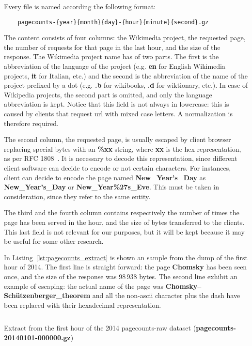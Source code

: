 Every file is named according the following format:
\begin{verbatim}
    pagecounts-{year}{month}{day}-{hour}{minute}{second}.gz
\end{verbatim}
The content consists of four columns: the Wikimedia project, the requested page, the number of requests for that page in the last hour, and the size of the response.
The Wikimedia project name has of two parts.
The first is the abbreviation of the language of the project (e.g. \textbf{en} for English Wikimedia projects, \textbf{it} for Italian, etc.) and the second is the abbreviation of the name of the project prefixed by a dot (e.g. \textbf{.b} for wikibooks, \textbf{.d} for wiktionary, etc.).
In case of Wikipedia projects, the second part is omitted, and only the language abbreviation is kept.
Notice that this field is not always in lowercase: this is caused by clients that request url with mixed case letters.
A normalization is therefore required.

The second column, the requested page, is usually escaped by client browser replacing special bytes with an \textbf{\%xx} string, where \textbf{xx} is the hex representation, as per RFC 1808~\cite{rfc1808}.
It is necessary to decode this representation, since different client software can decide to encode or not certain characters.
For instances, client can decide to encode the page named \textbf{New\_Year's\_Day} as \textbf{New\_Year's\_Day} or \textbf{New\_Year\%27s\_Eve}.
This must be taken in consideration, since they refer to the same entity.

The third and the fourth column contains respectively the number of times the page has been served in the hour, and the size of bytes transferred to the clients.
This last field is not relevant for our purposes, but it will be kept because it may be useful for some other research.

In Listing~\ref{lst:pagecounts_extract} is shown an sample from the dump of the first hour of 2014.
The first line is straight forward: the page \textbf{Chomsky} has been seen once, and the size of the response was 98\,938 bytes.
The second line exhibit an example of escaping: the actual name of the page was \textbf{Chomsky–Schützenberger\_theorem} and all the non-ascii character plus the dash have been replaced with their hexadecimal representation.

\begin{listing}[]
    \inputminted[breaklines=true]{xml}{assets/pagecounts_extract_first_hour.txt}
    \caption{Extract from the first hour of the 2014 pagecounts-raw dataset (\textbf{pagecounts-20140101-000000.gz})}
    \label{lst:pagecounts_extract}
\end{listing}

